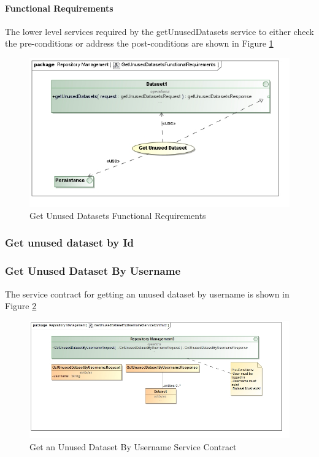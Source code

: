\paragraph{Functional Requirements}
The lower level services required by the getUnusedDatasets service to either check the
pre-conditions or address the post-conditions are shown in Figure \ref{fig:getUnusedDatasetsFR}
\begin{figure}[H]
  \begin{center}
  \includegraphics[scale=0.6]{../Diagrams and Charts/Test Data/GetUnusedDatasetsFunctionalRequirements.jpg}
  \caption{Get Unused Datasets Functional Requirements}
  \label{fig:getUnusedDatasetsFR}
  \end{center}
\end{figure}

\subsubsection {Get unused dataset by Id}

\subsubsection{Get Unused Dataset By Username}
The service contract for getting an unused dataset by username is shown in Figure \ref{fig:getUnusedDatasetByUsername}
\begin{figure}[H]
	\begin{center}
		\includegraphics[scale=0.6]{../Diagrams and Charts/Test Data/GetUnusedDatasetByUsernameServiceContract.jpg}
		\caption{Get an Unused Dataset By Username Service Contract}
		\label{fig:getUnusedDatasetByUsername}
	\end{center}
	
\end{figure}  

